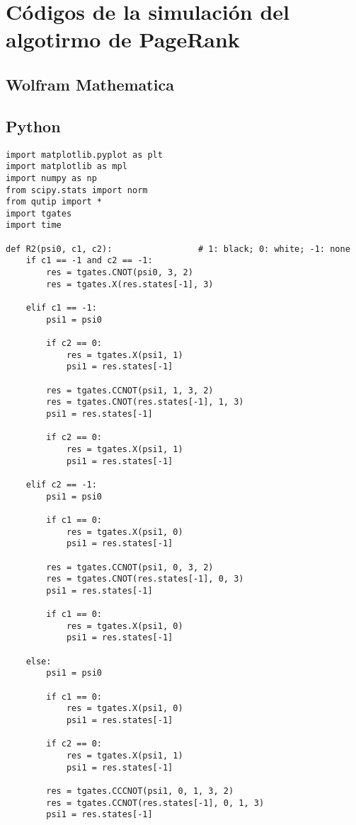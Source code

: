 \chapter{Códigos de la simulación del algotirmo de PageRank}
\label{ch:pagerankcod}

\section{Wolfram Mathematica}

\section{Python}

\begin{verbatim}
import matplotlib.pyplot as plt
import matplotlib as mpl
import numpy as np
from scipy.stats import norm
from qutip import *
import tgates
import time

def R2(psi0, c1, c2):                 # 1: black; 0: white; -1: none
    if c1 == -1 and c2 == -1:
        res = tgates.CNOT(psi0, 3, 2)
        res = tgates.X(res.states[-1], 3)

    elif c1 == -1:
        psi1 = psi0

        if c2 == 0:
            res = tgates.X(psi1, 1)
            psi1 = res.states[-1]

        res = tgates.CCNOT(psi1, 1, 3, 2)
        res = tgates.CNOT(res.states[-1], 1, 3)
        psi1 = res.states[-1]

        if c2 == 0:
            res = tgates.X(psi1, 1)
            psi1 = res.states[-1]

    elif c2 == -1:
        psi1 = psi0

        if c1 == 0:
            res = tgates.X(psi1, 0)
            psi1 = res.states[-1]

        res = tgates.CCNOT(psi1, 0, 3, 2)
        res = tgates.CNOT(res.states[-1], 0, 3)
        psi1 = res.states[-1]

        if c1 == 0:
            res = tgates.X(psi1, 0)
            psi1 = res.states[-1]

    else:
        psi1 = psi0

        if c1 == 0:
            res = tgates.X(psi1, 0)
            psi1 = res.states[-1]

        if c2 == 0:
            res = tgates.X(psi1, 1)
            psi1 = res.states[-1]

        res = tgates.CCCNOT(psi1, 0, 1, 3, 2)
        res = tgates.CCNOT(res.states[-1], 0, 1, 3)
        psi1 = res.states[-1]


\end{verbatim}
